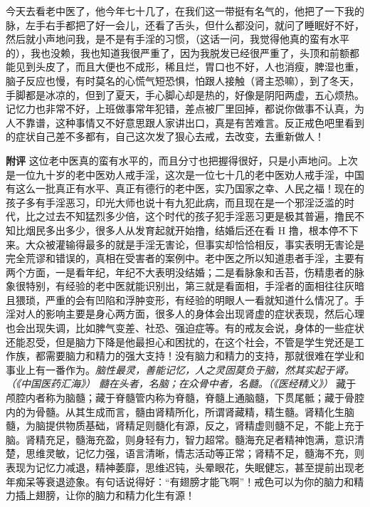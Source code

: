 \begin{case}
    今天去看老中医了，他今年七十几了，在我们这一带挺有名气的，他把了一下我的脉，左手右手都把了好一会儿，还看了舌头，但什么都没问，就问了睡眠好不好，然后就小声地问我，是不是有手淫的习惯，（这话一问，我觉得他真的蛮有水平的），我也没赖，我也知道我很严重了，因为我脱发已经很严重了，头顶和前额都能见到头皮了，而且大便也不成形，稀且烂，胃口也不好，人也消瘦，脾湿也重，脑子反应也慢，有时莫名的心慌气短恐惧，怕跟人接触（肾主恐嘛），到了冬天，手脚都是冰凉的，但到了夏天，手心脚心却是热的，好像是阴阳两虚，五心烦热。记忆力也非常不好，上班做事常年犯错，差点被厂里回掉，都说你做事不认真，为人不靠谱，这种事情又不好意思跟人家讲出口，真是有苦难言。反正戒色吧里看到的症状自己差不多都有，自己这次发了狠心去戒，去改变，去重新做人！

    \textbf{附评} 这位老中医真的蛮有水平的，而且分寸也把握得很好，只是小声地问。上次是一位九十岁的老中医劝人戒手淫，这次是一位七十几的老中医劝人戒手淫，中国有这么一批真正有水平、真正有德行的老中医，实乃国家之幸、人民之福！现在的孩子多有手淫恶习，印光大师也说十有九犯此病，而且现在是一个邪淫泛滥的时代，比之过去不知猛烈多少倍，这个时代的孩子犯手淫恶习更是极其普遍，撸民不知比烟民多出多少，很多人从发育起就开始撸，结婚后还在看 H 撸，根本停不下来。大众被灌输得最多的就是手淫无害论，但事实却恰恰相反，事实表明无害论是完全荒谬和错误的，真相在受害者的案例中。老中医之所以知道患者手淫，主要有两个方面，一是看年纪，年纪不大表明没结婚；二是看脉象和舌苔，伤精患者的脉象很特别，有经验的老中医就能识别出，第三就是看面相，手淫者的面相往往灰暗且猥琐，严重的会有凹陷和浮肿变形，有经验的明眼人一看就知道什么情况了。手淫对人的影响主要是身心两方面，很多人的身体会出现肾虚的症状表现，然后心理也会出现失调，比如脾气变差、社恐、强迫症等。有的戒友会说，身体的一些症状还能忍受，但是脑力下降是他最担心和困扰的，在这个社会，不管是学生党还是工作族，都需要脑力和精力的强大支持！没有脑力和精力的支持，那就很难在学业和事业上有一番作为。\textit{脑性最灵，善能记忆，人之灵固莫负于脑，然其实起于肾。（《中国医药汇海》）} \textit{髓在头者，名脑；在众骨中者，名髓。（《医经精义》）} 藏于颅腔内者称为脑髓；藏于脊髓管内称为脊髓，脊髓上通脑髓，下贯尾骶；藏于骨腔内的为骨髓。从其生成而言，髓由肾精所化，所谓肾藏精，精生髓。肾精化生脑髓，为脑提供物质基础，肾精足则髓化有源，反之，肾精虚则髓不足，不能上充于脑。肾精充足，髓海充盈，则身轻有力，智力超常。髓海充足者精神饱满，意识清楚，思维灵敏，记忆力强，语言清晰，情志活动等正常；肾精不足，髓海不充，则表现为记忆力减退，精神萎靡，思维迟钝，头晕眼花，失眠健忘，甚至提前出现老年痴呆等衰退迹象。有句话说得好：“有翅膀才能飞啊”！戒色可以为你的脑力和精力插上翅膀，让你的脑力和精力化生有源！
\end{case}


